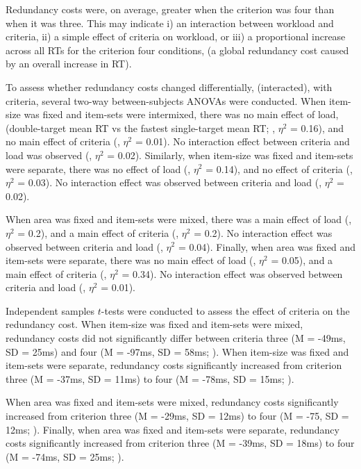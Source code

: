 Redundancy costs were, on average, greater when the criterion was four than when it was three. This may indicate i) an interaction between workload and criteria, ii) a simple effect of criteria on workload, or iii) a proportional increase across all RTs for the criterion four conditions, (\ie a global redundancy cost caused by an overall increase in RT).

To assess whether redundancy costs changed differentially, (\ie interacted), with criteria, several two-way between-subjects ANOVAs were conducted. When item-size was fixed and item-sets were intermixed, there was no main effect of load, (\ie double-target mean RT vs the fastest single-target mean RT; , $\eta^2$ = 0.16), and no main effect of criteria (, $\eta^2$ = 0.01). No interaction effect between criteria and load was observed (, $\eta^2$ = 0.02). Similarly, when item-size was fixed and item-sets were separate, there was no effect of load (, $\eta^2$ = 0.14), and no effect of criteria (, $\eta^2$ = 0.03). No interaction effect was observed between criteria and load (, $\eta^2$ = 0.02). 

When area was fixed and item-sets were mixed, there was a main effect of load (, $\eta^2$ = 0.2), and a main effect of criteria (, $\eta^2$ = 0.2). No interaction effect was observed between criteria and load (, $\eta^2$ = 0.04). Finally, when area was fixed and item-sets were separate, there was no main effect of load (, $\eta^2$ = 0.05), and a main effect of criteria (, $\eta^2$ = 0.34). No interaction effect was observed between criteria and load (, $\eta^2$ = 0.01).

Independent samples $t$-tests were conducted to assess the effect of criteria on the redundancy cost. When item-size was fixed and item-sets were mixed, redundancy costs did not significantly differ between criteria three (M = -49ms, SD = 25ms) and four (M = -97ms, SD = 58ms; ). When item-size was fixed and item-sets were separate, redundancy costs significantly increased from criterion three (M = -37ms, SD = 11ms) to four (M = -78ms, SD = 15ms; ).

When area was fixed and item-sets were mixed, redundancy costs significantly increased from criterion three (M = -29ms, SD = 12ms) to four (M = -75, SD = 12ms; ). Finally, when area was fixed and item-sets were separate, redundancy costs significantly increased from criterion three (M = -39ms, SD = 18ms) to four (M = -74ms, SD = 25ms; ).

